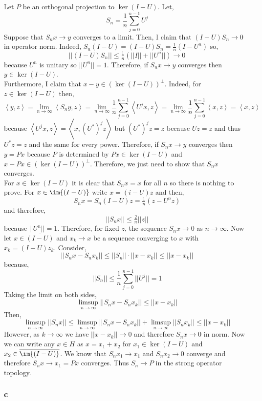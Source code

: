 \documentclass[12pt]{article}
\newcommand{\inner}[2]{\left< #1, #2 \right>}
\begin{document}
Let $P$ be an orthogonal projection to $\ker{(I - U)}$. Let,
\[ S_n = \frac{1}{n} \sum_{j = 0}^{n-1} U^j \]
Suppose that $S_n x \to y$ converges to a limit. Then, 
I claim that $(I - U) S_n \to 0$ in operator norm. Indeed, $S_n (I - U) = (I - U) S_n = \frac{1}{n} (I - U^n)$ so,
\[ ||(I - U) S_n|| \le \tfrac{1}{n} (|| I || + || U^n ||) \to 0 \]
because $U^n$ is unitary so $|| U^n || = 1$. Therefore, if $S_n x \to y$ converges then $y \in \ker{(I - U)}$.
\bigskip\\
Furthermore, I claim that $x - y \in (\ker{(I - U)})^\perp$. Indeed, for $z \in \ker{(I - U)}$ then,
\[ \inner{y}{z} = \lim_{n \to \infty} \inner{S_n y}{z} = \lim_{n \to \infty} \frac{1}{n} \sum_{j = 0}^{n-1} \inner{U^j x}{z} = \lim_{n \to \infty} \frac{1}{n} \sum_{j = 0}^{n-1} \inner{x}{z} = \inner{x}{z} \]
because $\inner{U^j x}{z} = \inner{x}{(U^*)^j z}$ but $(U^*)^j z = z$ because $U z = z$ and thus $U^* z = z$ and the same for every power. Therefore, if $S_n x \to y$ converges then $y = P x$ because $P$ is determined by $P x \in \ker{(I - U)}$ and $x - P x \in (\ker{(I - U)})^\perp$. Therefore, we just need to show that $S_n x$ converges.
\bigskip\\
For $x \in \ker{(I - U)}$ it is clear that $S_n x = x$ for all $n$ so there is nothing to prove. For $x \in \im{(I - U)}$ write $x = (i - U) z$ and then,
\[ S_n x = S_n (I - U) z = \tfrac{1}{n} (z - U^n z) \]
and therefore,
\[ || S_n x || \le \tfrac{2}{n} || z || \]
because $||U^n || = 1$. Therefore, for fixed $z$, the sequence $S_n x \to 0$ as $n \to \infty$. Now let $x \in \overline{(I - U)}$ and $x_k \to x$ be a sequence converging to $x$ with $x_k = (I - U) z_k$. Consider,
\[ || S_n x - S_n x_k || \le || S_n || \cdot || x - x_k || \le || x - x_k || \]
because,
\[ || S_n || \le \frac{1}{n} \sum_{j = 0}^{n-1} || U^j || = 1 \]
Taking the limit on both sides,
\[ \limsup_{n \to \infty} || S_n x - S_n x_k || \le || x - x_k || \]
Then,
\[ \limsup_{n \to \infty} || S_n x || \le \limsup_{n \to \infty} || S_n x - S_n x_k || + \limsup_{n \to \infty} || S_n x_k || \le || x - x_k || \]
However, as $k \to \infty$ we have $|| x - x_k || \to 0$ and therefore $S_n x \to 0$ in norm. Now we can write any $x \in H$ as $x = x_1 + x_2$ for $x_1 \in \ker{(I - U)}$ and $x_2 \in \overline{\im{(I - U)}}$. We know that $S_n x_1 \to x_1$ and $S_n x_2 \to 0$ converge and therefore $S_n x \to x_1 = P x$ converges. Thus $S_n \to P$ in the strong operator topology.

\subsubsection{c}
\end{document}
